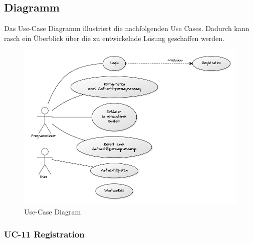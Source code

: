 \newpage

\subsection{Diagramm}\label{diagramm}

Das Use-Case Diagramm illustriert die nachfolgenden Use Cases. Dadurch
kann rasch ein Überblick über die zu entwickelnde Lösung geschaffen
werden.

\begin{figure}[htbp]
\centering
\includegraphics{images/use-case-diagram.png}
\caption{Use-Case Diagram}
\end{figure}

\newpage

\subsubsection{UC-11 Registration}\label{uc-11-registration}

